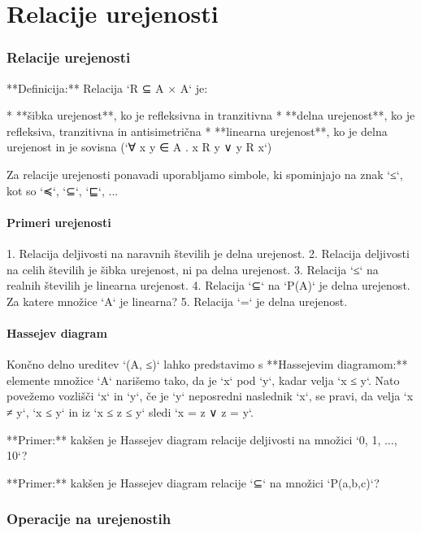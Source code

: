 \chapter{Relacije urejenosti}

\subsection{Relacije urejenosti}

**Definicija:** Relacija `R ⊆ A × A` je:

* **šibka urejenost**, ko je refleksivna in tranzitivna
* **delna urejenost**, ko je refleksiva, tranzitivna in antisimetrična
* **linearna urejenost**, ko je delna urejenost in je sovisna (`∀ x y ∈ A . x R y ∨ y R x`)

Za relacije urejenosti ponavadi uporabljamo simbole, ki spominjajo na znak `≤`, kot so `≼`, `⊆`, `⊑`, ...

\subsubsection{Primeri urejenosti}

1. Relacija deljivosti na naravnih številih je delna urejenost.
2. Relacija deljivosti na celih številih je šibka urejenost, ni pa delna urejenost.
3. Relacija `≤` na realnih številih je linearna urejenost.
4. Relacija `⊆` na `P(A)` je delna urejenost. Za katere množice `A` je linearna?
5. Relacija `=` je delna urejenost.

\subsubsection{Hassejev diagram}

Končno delno ureditev `(A, ≤)` lahko predstavimo s **Hassejevim diagramom:** elemente
množice `A` narišemo tako, da je `x` pod `y`, kadar velja `x ≤ y`. Nato povežemo vozlišči
`x` in `y`, če je `y` neposredni naslednik `x`, se pravi, da velja `x ≠ y`, `x ≤ y` in iz
`x ≤ z ≤ y` sledi `x = z ∨ z = y`.

**Primer:** kakšen je Hassejev diagram relacije deljivosti na množici `{0, 1, ..., 10}`?

**Primer:** kakšen je Hassejev diagram relacije `⊆` na množici `P({a,b,c})`?

\subsection{Operacije na urejenostih}

